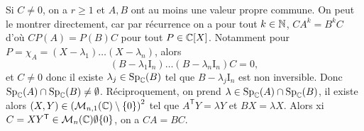 \documentclass[12pt]{article}
\begin{document}
\begin{remark}
	Si $C\neq0$, on a $r\geqslant 1$ et $A,B$ ont au moins une valeur propre commune. On peut le montrer directement, car par récurrence on a pour tout $k\in\mathbb{N}$, $CA^{k}=B^{k}C$ d'où $CP(A)=P(B)C$ pour tout $P\in\mathbb{C}[X]$. Notamment pour $P=\chi_{A}=(X-\lambda_1)\dots(X-\lambda_n)$, alors 
	\begin{equation*}
		(B-\lambda_1\mathrm{I}_n)\dots(B-\lambda_n\mathrm{I}_n)C=0,
	\end{equation*}
	et $C\neq0$ donc il existe $\lambda_j\in\operatorname{Sp}_{\mathbb{C}}(B)$ tel que $B-\lambda_j\mathrm{I}_n$ est non inversible. Donc $\operatorname{Sp}_{\mathbb{C}}(A)\cap\operatorname{Sp}_{\mathbb{C}}(B)\neq\emptyset$. Réciproquement, on prend $\lambda\in\operatorname{Sp}_{\mathbb{C}}(A)\cap\operatorname{Sp}_{\mathbb{C}}(B)$, il existe alors $(X,Y)\in\left(\mathcal{M}_{n,1}(\mathbb{C})\setminus\lbrace0\rbrace\right)^{2}$ tel que $A^{\mathsf{T}}Y=\lambda Y$ et $BX=\lambda X$. Alors xi $C=XY^{\mathsf{T}}\in\mathcal{M}_n(\mathbb{C})\emptyset\lbrace0\rbrace$, on a $CA=BC$.
\end{remark}
\end{document}
